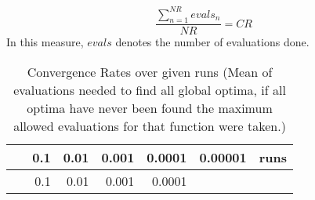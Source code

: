 \documentclass[12pt,a4paper]{article}
\begin{document}
\[\frac{\sum\nolimits_{n=1}^{NR} evals_{n}}{NR} = CR\] In this measure,
\(evals\) denotes the number of evaluations done. \newline

\begin{longtable}[c]{@{}crrrrrr@{}}
\caption{Convergence Rates over given runs (Mean of evaluations needed
to find all global optima, if all optima have never been found the
maximum allowed evaluations for that function were
taken.)}\tabularnewline
\toprule
\begin{minipage}[b]{0.11\columnwidth}\centering\strut
~
\strut\end{minipage} &
\begin{minipage}[b]{0.08\columnwidth}\raggedleft\strut
0.1
\strut\end{minipage} &
\begin{minipage}[b]{0.08\columnwidth}\raggedleft\strut
0.01
\strut\end{minipage} &
\begin{minipage}[b]{0.09\columnwidth}\raggedleft\strut
0.001
\strut\end{minipage} &
\begin{minipage}[b]{0.10\columnwidth}\raggedleft\strut
0.0001
\strut\end{minipage} &
\begin{minipage}[b]{0.11\columnwidth}\raggedleft\strut
0.00001
\strut\end{minipage} &
\begin{minipage}[b]{0.07\columnwidth}\raggedleft\strut
runs
\strut\end{minipage}\tabularnewline
\midrule
\endfirsthead
\toprule
\begin{minipage}[b]{0.11\columnwidth}\centering\strut
~
\strut\end{minipage} &
\begin{minipage}[b]{0.08\columnwidth}\raggedleft\strut
0.1
\strut\end{minipage} &
\begin{minipage}[b]{0.08\columnwidth}\raggedleft\strut
0.01
\strut\end{minipage} &
\begin{minipage}[b]{0.09\columnwidth}\raggedleft\strut
0.001
\strut\end{minipage} &
\begin{minipage}[b]{0.10\columnwidth}\raggedleft\strut
0.0001
\strut\end{minipage} &
\begin{minipage}[b]{0.11\columnwidth}\raggedleft\strut

\end{minipage}
\end{longtable}
\end{document}
